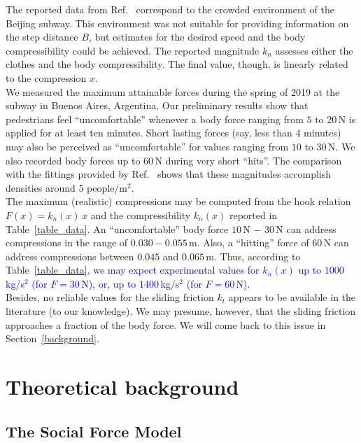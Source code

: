 \documentclass[preprint,12pt]{elsarticle}
\begin{document}
The reported data from Ref.~\cite{song_2019} correspond to the crowded 
environment of the Beijing subway. This environment was not suitable for 
providing information on the step distance $B$, but estimates for the 
desired speed and the body compressibility could be achieved. The reported 
magnitude $k_n$ assesses either the clothes and the body compressibility. The 
final value, though, is linearly related to the compression $x$. \\

We measured the maximum attainable forces during the spring of 2019 at the subway in Buenos Aires, 
Argentina. Our preliminary results show that pedestrians feel ``uncomfortable'' 
whenever a body force ranging from $5$ to $20\,$N is applied for at least ten 
minutes. Short lasting forces (say, less than 4 minutes) may also be perceived 
as ``uncomfortable'' for values ranging from $10$ to $30\,$N. We also recorded body 
forces up to $60\,$N during very short ``hits''. The comparison with the 
fittings provided by Ref.~\cite{song_2019} shows that these magnitudes 
accomplish densities around 5 people/m$^2$.     \\    

The maximum (realistic) compressions may be computed from the hook relation 
$F(x)=k_n(x)\,x$ and the compressibility $k_n(x)$ reported in Table~\ref{table_data}. 
An ``uncomfortable'' body force  $10\,$N $-$ $30\,$N can address compressions in the 
range of $0.030-0.055\,$m. Also, a ``hitting'' force of $60\,$N can address 
compressions between $0.045$ and $0.065\,$m. Thus, according to 
Table~\ref{table_data}, \textcolor{blue}{we may expect experimental values for $k_n(x)$ up to 
$1000\,$kg/s$^2$ (for $F=30\,$N), or, up to $1400\,$kg/s$^2$ (for $F=60\,$N).} \\

Besides, no reliable values for the sliding friction $k_t$ appears to be 
available in the literature (to our knowledge). We may presume, however, that 
the sliding friction approaches a fraction of the body force. We will come back 
to this issue in Section~\ref{background}. \\


\section{\label{background}Theoretical background}

\subsection{\label{sfm}The Social Force Model}
\end{document}
